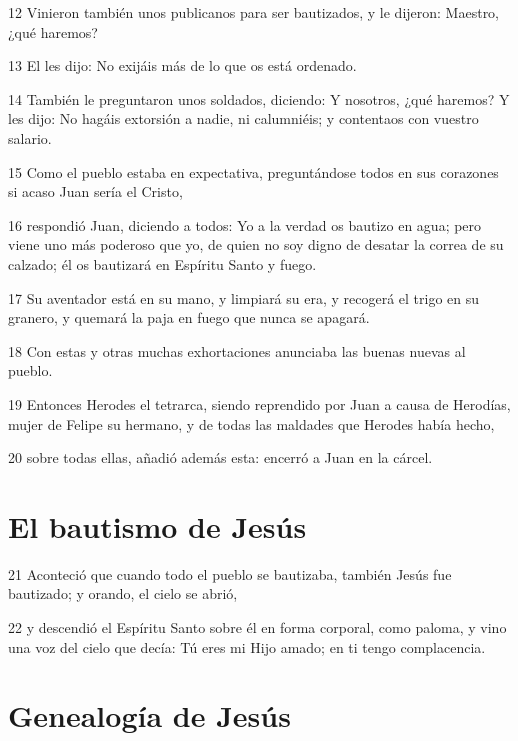 \par 12 Vinieron también unos publicanos para ser bautizados, y le dijeron: Maestro, ¿qué haremos?
\par 13 El les dijo: No exijáis más de lo que os está ordenado.
\par 14 También le preguntaron unos soldados, diciendo: Y nosotros, ¿qué haremos? Y les dijo: No hagáis extorsión a nadie, ni calumniéis; y contentaos con vuestro salario.
\par 15 Como el pueblo estaba en expectativa, preguntándose todos en sus corazones si acaso Juan sería el Cristo,
\par 16 respondió Juan, diciendo a todos: Yo a la verdad os bautizo en agua; pero viene uno más poderoso que yo, de quien no soy digno de desatar la correa de su calzado; él os bautizará en Espíritu Santo y fuego.
\par 17 Su aventador está en su mano, y limpiará su era, y recogerá el trigo en su granero, y quemará la paja en fuego que nunca se apagará.
\par 18 Con estas y otras muchas exhortaciones anunciaba las buenas nuevas al pueblo.
\par 19 Entonces Herodes el tetrarca, siendo reprendido por Juan a causa de Herodías, mujer de Felipe su hermano, y de todas las maldades que Herodes había hecho,
\par 20 sobre todas ellas, añadió además esta: encerró a Juan en la cárcel.

\section*{El bautismo de Jesús}

\par 21 Aconteció que cuando todo el pueblo se bautizaba, también Jesús fue bautizado; y orando, el cielo se abrió,
\par 22 y descendió el Espíritu Santo sobre él en forma corporal, como paloma, y vino una voz del cielo que decía: Tú eres mi Hijo amado; en ti tengo complacencia.

\section*{Genealogía de Jesús}

